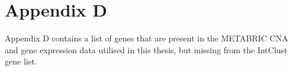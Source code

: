 \section*{Appendix D}
\renewcommand{\thefigure}{D\arabic{figure}}
\renewcommand{\thetable}{D\arabic{table}}
\setcounter{figure}{0}
\setcounter{table}{0}

{}


Appendix D contains a list of genes that are present in the METABRIC CNA and gene expression data utilised in this thesis, but missing from the IntClust gene list. 


